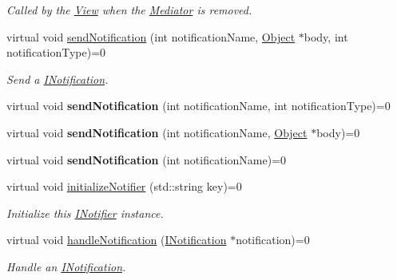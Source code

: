 \begin{DoxyCompactItemize}
\begin{DoxyCompactList}\small\item\em Called by the \hyperlink{class_pure_m_v_c_1_1_view}{View} when the \hyperlink{class_pure_m_v_c_1_1_mediator}{Mediator} is removed. \item\end{DoxyCompactList}\item 
virtual void \hyperlink{class_pure_m_v_c_1_1_i_notifier_a65e8333ccfea74138b79f84dac96af25}{sendNotification} (int notificationName, \hyperlink{class_pure_m_v_c_1_1_object}{Object} $\ast$body, int notificationType)=0
\begin{DoxyCompactList}\small\item\em Send a {\ttfamily \hyperlink{class_pure_m_v_c_1_1_i_notification}{INotification}}. \item\end{DoxyCompactList}\item 
\hypertarget{class_pure_m_v_c_1_1_i_notifier_ad9421945c1e0fd6d7ebbc136f9ecfba3}{
virtual void {\bfseries sendNotification} (int notificationName, int notificationType)=0}
\label{class_pure_m_v_c_1_1_i_notifier_ad9421945c1e0fd6d7ebbc136f9ecfba3}

\item 
\hypertarget{class_pure_m_v_c_1_1_i_notifier_a4d6bac0719be96948e4f7417489daeaa}{
virtual void {\bfseries sendNotification} (int notificationName, \hyperlink{class_pure_m_v_c_1_1_object}{Object} $\ast$body)=0}
\label{class_pure_m_v_c_1_1_i_notifier_a4d6bac0719be96948e4f7417489daeaa}

\item 
\hypertarget{class_pure_m_v_c_1_1_i_notifier_aca921608a2ced017a8face049fc7c6af}{
virtual void {\bfseries sendNotification} (int notificationName)=0}
\label{class_pure_m_v_c_1_1_i_notifier_aca921608a2ced017a8face049fc7c6af}

\item 
virtual void \hyperlink{class_pure_m_v_c_1_1_i_notifier_a28d7dbbe0726d4d52080546c5d79b232}{initializeNotifier} (std::string key)=0
\begin{DoxyCompactList}\small\item\em Initialize this \hyperlink{class_pure_m_v_c_1_1_i_notifier}{INotifier} instance. \item\end{DoxyCompactList}\item 
virtual void \hyperlink{class_pure_m_v_c_1_1_i_notification_handler_af31efbe0929caff0ac371bf45d3e9c50}{handleNotification} (\hyperlink{class_pure_m_v_c_1_1_i_notification}{INotification} $\ast$notification)=0
\begin{DoxyCompactList}\small\item\em Handle an {\ttfamily \hyperlink{class_pure_m_v_c_1_1_i_notification}{INotification}}. \item\end{DoxyCompactList}\end{DoxyCompactItemize}


